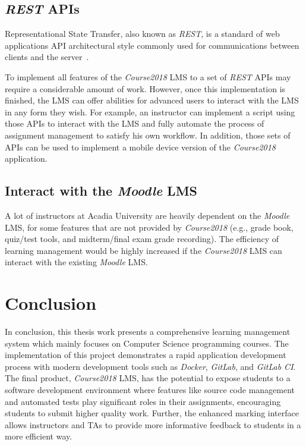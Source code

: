 \subsection{\emph{REST} APIs}
Representational State Transfer, also known as \emph{REST}, is a standard of
web applications API architectural style commonly used for communications
between clients and the server~\citep[Chapter 5]{REST}.

To implement all features of the \emph{Course2018} LMS to a set of \emph{REST} APIs
may require a considerable amount of work. However, once this implementation is
finished, the LMS can offer abilities for advanced users to interact with the
LMS in any form they
wish. For example, an instructor can implement a script using those APIs to
interact with the LMS and fully automate the process of assignment management
to satisfy his own workflow. In addition, those sets of APIs can be used
to implement a mobile device version of the \emph{Course2018} application.

\subsection{Interact with the \emph{Moodle} LMS}
A lot of instructors at Acadia University are heavily dependent on the
\emph{Moodle} LMS, for some features that are not provided by
\emph{Course2018} (e.g., grade book, quiz/test tools, and midterm/final
exam grade recording). The efficiency of learning management would be
highly increased if the \emph{Course2018} LMS can interact with the existing
\emph{Moodle} LMS\null.


\section{Conclusion}
In conclusion, this thesis work presents a comprehensive
learning management system which mainly focuses on Computer Science
programming courses. The implementation of this project demonstrates
a rapid application development process with modern development tools
such as \emph{Docker}, \emph{GitLab}, and \emph{GitLab CI}\null.
The final product, \emph{Course2018} LMS, has the potential to expose
students to a software development environment where features like source
code management and
automated tests play significant roles in their assignments, encouraging
students to submit higher quality work.
Further,
the enhanced marking interface allows instructors and TAs to provide more
informative feedback to students in a more efficient way.